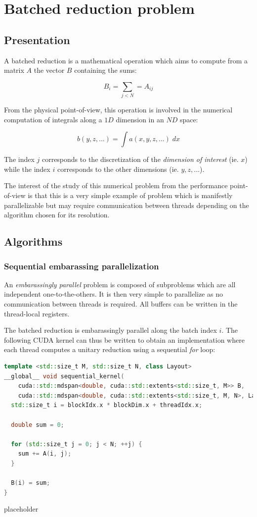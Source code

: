 \documentclass{article}
\begin{document}
\section{Batched reduction problem}

\subsection{Presentation}

A batched reduction is a mathematical operation which aims to compute from a matrix $A$ the vector $B$ containing the sums:

\[
B_i = \sum_{j<N} = A_{ij}
\]

From the physical point-of-view, this operation is involved in the numerical computation of integrals along a $1D$ dimension in an $ND$ space:

\[
b(y, z, ...) = \int a(x, y, z, ...)\; dx
\]

The index $j$ corresponds to the discretization of the \textit{dimension of interest} (ie. $x$) while the index $i$ corresponds to the other dimensions (ie. $y, z, ...$).

The interest of the study of this numerical problem from the performance point-of-view is that this is a very simple example of problem which is manifestly parallelizable but may require communication between threads depending on the algorithm chosen for its resolution.

\subsection{Algorithms}

\subsubsection{Sequential embarassing parallelization}

An \textit{embarassingly parallel} problem is composed of subproblems which are all independent one-to-the-others. It is then very simple to parallelize as no communication between threads is required. All buffers can be written in the thread-local registers.

The batched reduction is embarassingly parallel along the batch index $i$. The following CUDA kernel can thus be written to obtain an implementation where each thread computes a unitary reduction using a sequential \textit{for} loop:

\begin{lstlisting}[language=C++]
template <std::size_t M, std::size_t N, class Layout>
__global__ void sequential_kernel(
    cuda::std::mdspan<double, cuda::std::extents<std::size_t, M>> B,
    cuda::std::mdspan<double, cuda::std::extents<std::size_t, M, N>, Layout> A) {
  std::size_t i = blockIdx.x * blockDim.x + threadIdx.x;

  double sum = 0;

  for (std::size_t j = 0; j < N; ++j) {
    sum += A(i, j);
  }

  B(i) = sum;
}
\end{lstlisting}

placeholder\cite{cudasharedmemory}

\newpage
\nocite{*}


\end{document}
